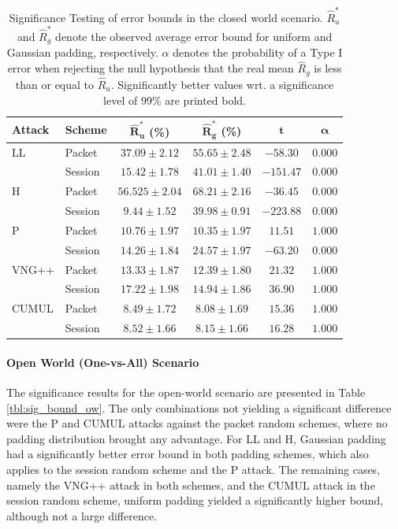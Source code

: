 \documentclass[
	ruledheaders=chapter,
	class=report,
	thesis={type=master, department=inf},
	accentcolor=1c,
	custommargins=true,
	marginpar=false,
	parskip=half-,
	fontsize=11pt,
]{tudapub}
\begin{document}
	\begin{table}
		\centering
		\small
		\begin{tabular}{llcccc}
			\toprule \textbf{Attack} & \textbf{Scheme} & $\mathbf{\widehat{R}^*_u}$ \textbf{(\%)} & $\mathbf{\widehat{R}^*_g}$  \textbf{(\%)} & $\mathbf{t}$ & $\mathbf{\alpha}$ \\
			\midrule LL & Packet & $37.09 \pm 2.12$ & $\mathbf{55.65 \pm 2.48}$ & $-58.30$ & $0.000$\\
			& Session & $15.42 \pm 1.78$ & $\mathbf{41.01 \pm 1.40}$ & $-151.47$ &  $0.000$\\ \addlinespace
			H & Packet & $56.525 \pm 2.04$ & $\mathbf{68.21 \pm 2.16}$ & $-36.45$ & $0.000$ \\
			& Session & $9.44 \pm 1.52$ & $\mathbf{39.98 \pm 0.91}$ & $-223.88$ & $0.000$ \\ \addlinespace
			P & Packet & $\mathbf{10.76 \pm 1.97}$ & $10.35 \pm 1.97$ & $11.51$ & $1.000$ \\
			& Session & $14.26 \pm 1.84$ & $\mathbf{24.57 \pm 1.97}$ & $-63.20$ & $0.000$ \\ \addlinespace
			VNG++ & Packet & $\mathbf{13.33 \pm 1.87}$ & $12.39 \pm 1.80$ & $21.32$ & $1.000$ \\
			& Session & $\mathbf{17.22 \pm 1.98}$ & $14.94 \pm 1.86$ & $36.90$ & $1.000$ \\ \addlinespace
			CUMUL & Packet & $\mathbf{8.49\pm 1.72}$ & $8.08 \pm 1.69$ & $15.36$ & $1.000$\\
			& Session & $\mathbf{8.52 \pm 1.66}$ & $8.15 \pm 1.66$ & $16.28$ & $1.000$ \\
			\bottomrule
		\end{tabular}
		\caption[Significance Testing of error bounds in the closed world scenario]{Significance Testing of error bounds in the closed world scenario. $\widehat{R}^*_u$ and $\widehat{R}^*_g$ denote the observed average error bound for uniform and Gaussian padding, respectively. $\alpha$ denotes the probability of a Type I error when rejecting the null hypothesis that the real mean $\widehat{R}_g$ is less than or equal to $\widehat{R}_u$. Significantly better values wrt. a significance level of 99\% are printed bold. }
		\label{tbl:sig_bound_cw}
	\end{table}

	\paragraph{Open World (One-vs-All) Scenario} The significance results for the open-world scenario are presented in Table \ref{tbl:sig_bound_ow}. The only combinations not yielding a significant difference were the P and CUMUL attacks against the packet random schemes, where no padding distribution brought any advantage. For LL and H, Gaussian padding had a significantly better error bound in both padding schemes, which also applies to the session random scheme and the P attack. The remaining cases, namely the VNG++ attack in both schemes, and the CUMUL attack in the session random scheme, uniform padding yielded a significantly higher bound, although not a large difference.
	
\end{document}
